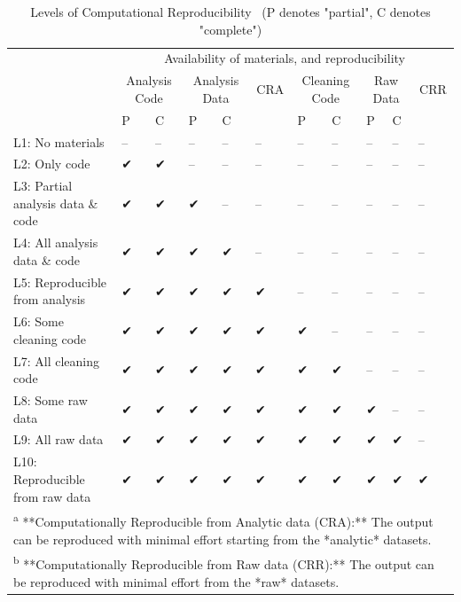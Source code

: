 \documentclass[
]{book}
\begin{document}
\begin{table}

\caption{\label{tab:levels-of-computational-reproducibility}Levels of Computational Reproducibility \
 (P denotes "partial", C denotes "complete")}
\centering
\begin{tabular}[t]{l|l|l|l|l|l|l|l|l|l|l}
\hline
\multicolumn{1}{c|}{ } & \multicolumn{10}{c}{Availability of materials, and reproducibility} \\
\cline{2-11}
\multicolumn{1}{c|}{ } & \multicolumn{2}{c|}{Analysis Code} & \multicolumn{2}{c|}{Analysis Data} & \multicolumn{1}{c|}{CRA} & \multicolumn{2}{c|}{Cleaning Code} & \multicolumn{2}{c|}{Raw Data} & \multicolumn{1}{c}{CRR} \\
\cline{2-3} \cline{4-5} \cline{6-6} \cline{7-8} \cline{9-10} \cline{11-11}
  & P & C & P & C &   & P & C & P & C &  \\
\hline
L1: No materials & -- & -- & -- & -- & -- & -- & -- & -- & -- & --\\
\hline
L2: Only code & ✔ & ✔ & -- & -- & -- & -- & -- & -- & -- & --\\
\hline
L3: Partial analysis data \& code & ✔ & ✔ & ✔ & -- & -- & -- & -- & -- & -- & --\\
\hline
L4: All analysis data \& code & ✔ & ✔ & ✔ & ✔ & -- & -- & -- & -- & -- & --\\
\hline
L5: Reproducible from analysis & ✔ & ✔ & ✔ & ✔ & ✔ & -- & -- & -- & -- & --\\
\hline
L6: Some cleaning code & ✔ & ✔ & ✔ & ✔ & ✔ & ✔ & -- & -- & -- & --\\
\hline
L7: All cleaning code & ✔ & ✔ & ✔ & ✔ & ✔ & ✔ & ✔ & -- & -- & --\\
\hline
L8: Some raw data & ✔ & ✔ & ✔ & ✔ & ✔ & ✔ & ✔ & ✔ & -- & --\\
\hline
L9: All raw data & ✔ & ✔ & ✔ & ✔ & ✔ & ✔ & ✔ & ✔ & ✔ & --\\
\hline
L10: Reproducible from raw data & ✔ & ✔ & ✔ & ✔ & ✔ & ✔ & ✔ & ✔ & ✔ & ✔\\
\hline
\multicolumn{11}{l}{\textsuperscript{a} **Computationally Reproducible from Analytic data (CRA):** The output can be reproduced with minimal effort starting from the *analytic* datasets.}\\
\multicolumn{11}{l}{\textsuperscript{b} **Computationally Reproducible from Raw data (CRR):** The output can be reproduced with minimal effort from the *raw* datasets.}\\
\end{tabular}
\end{table}
\end{document}
